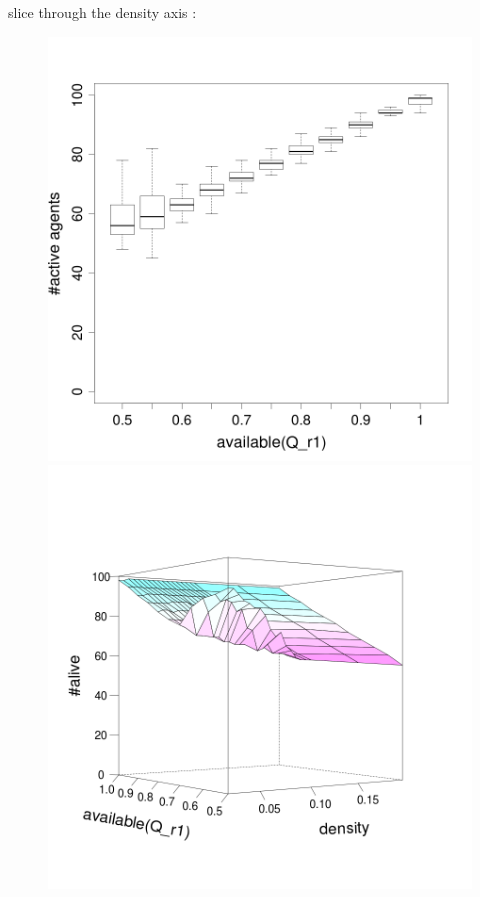 \documentclass[8pt, handout=show,notes=show]{beamer}
\begin{document}
\begin{frame}{ slice through the density axis : }
\begin{figure}[H]
\includegraphics[width=\imgSize]{images/alive_r1_density-60.png}
\includegraphics[width=\imgSize]{images/active_median}

\end{figure}
\end{frame}
\end{document}
